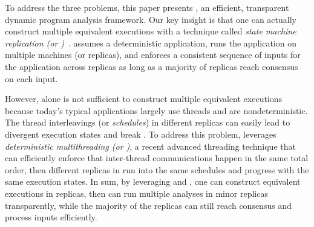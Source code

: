 

To address the three problems, this paper presents \xxx, an efficient, 
transparent dynamic program analysis framework. Our key insight is that one can 
actually construct multiple equivalent executions with a technique called 
\emph{state machine replication (or \smr)}~\cite{paxos:simple, 
paxos:practical}. \smr assumes a deterministic application, runs the 
application on multiple machines (or replicas), and enforces a consistent 
sequence of inputs for the application across replicas as long as a majority of 
replicas reach consensus on each input.


However, \smr alone is not sufficient to construct multiple equivalent 
executions because today's typical applications largely use threads and are 
nondeterministic. The thread interleavings (or \emph{schedules}) in different 
replicas can easily lead to divergent execution states and break \smr. To 
address this problem, \xxx leverages \emph{deterministic multithreading (or 
\dmt)}, a recent advanced threading technique that can efficiently enforce that 
inter-thread communications happen in the same total order, then different 
replicas in \smr run into the same schedules and progress with the same 
execution states. In sum, by leveraging \smr and \dmt, one can construct 
equivalent executions in replicas, then \xxx can run multiple analyses in 
minor replicas transparently, while the majority of the replicas can still 
reach consensus and process inputs efficiently.


